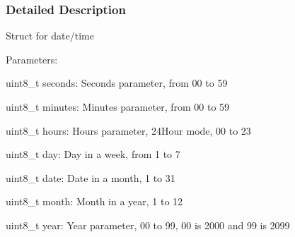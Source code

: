 \subsubsection{Detailed Description}
Struct for date/time

Parameters\+:
\begin{DoxyItemize}
\item uint8\+\_\+t seconds\+: Seconds parameter, from 00 to 59
\item uint8\+\_\+t minutes\+: Minutes parameter, from 00 to 59
\item uint8\+\_\+t hours\+: Hours parameter, 24\+Hour mode, 00 to 23
\item uint8\+\_\+t day\+: Day in a week, from 1 to 7
\item uint8\+\_\+t date\+: Date in a month, 1 to 31
\item uint8\+\_\+t month\+: Month in a year, 1 to 12
\item uint8\+\_\+t year\+: Year parameter, 00 to 99, 00 is 2000 and 99 is 2099 
\end{DoxyItemize}